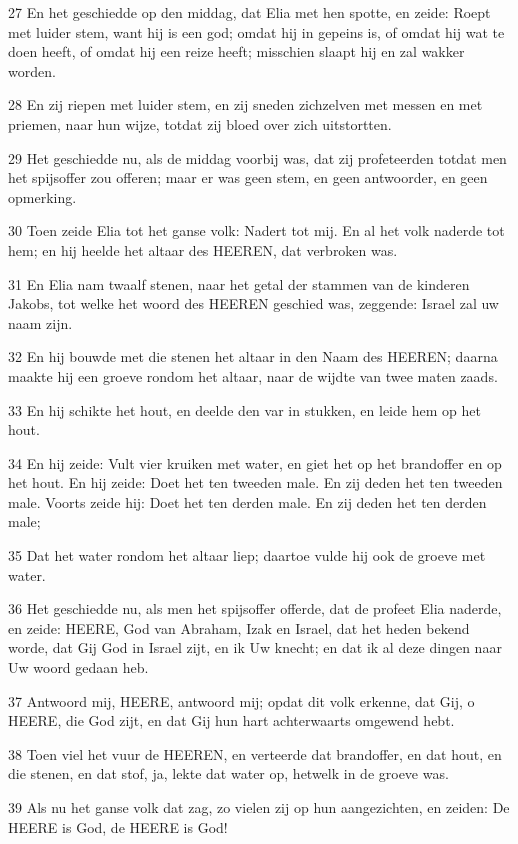 \par 27 En het geschiedde op den middag, dat Elia met hen spotte, en zeide: Roept met luider stem, want hij is een god; omdat hij in gepeins is, of omdat hij wat te doen heeft, of omdat hij een reize heeft; misschien slaapt hij en zal wakker worden.
\par 28 En zij riepen met luider stem, en zij sneden zichzelven met messen en met priemen, naar hun wijze, totdat zij bloed over zich uitstortten.
\par 29 Het geschiedde nu, als de middag voorbij was, dat zij profeteerden totdat men het spijsoffer zou offeren; maar er was geen stem, en geen antwoorder, en geen opmerking.
\par 30 Toen zeide Elia tot het ganse volk: Nadert tot mij. En al het volk naderde tot hem; en hij heelde het altaar des HEEREN, dat verbroken was.
\par 31 En Elia nam twaalf stenen, naar het getal der stammen van de kinderen Jakobs, tot welke het woord des HEEREN geschied was, zeggende: Israel zal uw naam zijn.
\par 32 En hij bouwde met die stenen het altaar in den Naam des HEEREN; daarna maakte hij een groeve rondom het altaar, naar de wijdte van twee maten zaads.
\par 33 En hij schikte het hout, en deelde den var in stukken, en leide hem op het hout.
\par 34 En hij zeide: Vult vier kruiken met water, en giet het op het brandoffer en op het hout. En hij zeide: Doet het ten tweeden male. En zij deden het ten tweeden male. Voorts zeide hij: Doet het ten derden male. En zij deden het ten derden male;
\par 35 Dat het water rondom het altaar liep; daartoe vulde hij ook de groeve met water.
\par 36 Het geschiedde nu, als men het spijsoffer offerde, dat de profeet Elia naderde, en zeide: HEERE, God van Abraham, Izak en Israel, dat het heden bekend worde, dat Gij God in Israel zijt, en ik Uw knecht; en dat ik al deze dingen naar Uw woord gedaan heb.
\par 37 Antwoord mij, HEERE, antwoord mij; opdat dit volk erkenne, dat Gij, o HEERE, die God zijt, en dat Gij hun hart achterwaarts omgewend hebt.
\par 38 Toen viel het vuur de HEEREN, en verteerde dat brandoffer, en dat hout, en die stenen, en dat stof, ja, lekte dat water op, hetwelk in de groeve was.
\par 39 Als nu het ganse volk dat zag, zo vielen zij op hun aangezichten, en zeiden: De HEERE is God, de HEERE is God!
